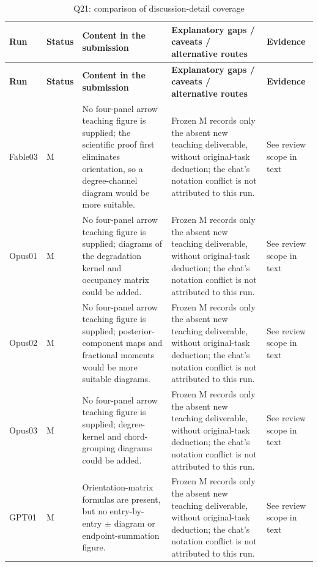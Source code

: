 \documentclass[11pt,a4paper]{article}
\begin{document}
{\fontsize{9.0}{12.6}\selectfont
\setlength{\tabcolsep}{2.5pt}
\begin{longtable}{>{\raggedright\arraybackslash}p{}>{\raggedright\arraybackslash}p{}>{\raggedright\arraybackslash}p{}>{\raggedright\arraybackslash}p{}>{\raggedright\arraybackslash}p{}}
\caption{Q21: comparison of discussion-detail coverage}\\
\toprule
\textbf{Run} & \textbf{Status} & \textbf{Content in the submission} & \textbf{Explanatory gaps /\allowbreak{} caveats /\allowbreak{} alternative routes} & \textbf{Evidence}\tabularnewline
\midrule
\endfirsthead
\toprule
\textbf{Run} & \textbf{Status} & \textbf{Content in the submission} & \textbf{Explanatory gaps /\allowbreak{} caveats /\allowbreak{} alternative routes} & \textbf{Evidence}\tabularnewline
\midrule
\endhead
{}Fable03 & M & No four-panel arrow teaching figure is supplied; the scientific proof first eliminates orientation,\allowbreak{} so a degree-channel diagram would be more suitable. & Frozen M records only the absent new teaching deliverable,\allowbreak{} without original-task deduction; the chat’s notation conflict is not attributed to this run. & See review scope in text\tabularnewline
{}Opus01 & M & No four-panel arrow teaching figure is supplied; diagrams of the degradation kernel and occupancy matrix could be added. & Frozen M records only the absent new teaching deliverable,\allowbreak{} without original-task deduction; the chat’s notation conflict is not attributed to this run. & See review scope in text\tabularnewline
{}Opus02 & M & No four-panel arrow teaching figure is supplied; posterior-component maps and fractional moments would be more suitable diagrams. & Frozen M records only the absent new teaching deliverable,\allowbreak{} without original-task deduction; the chat’s notation conflict is not attributed to this run. & See review scope in text\tabularnewline
{}Opus03 & M & No four-panel arrow teaching figure is supplied; degree-kernel and chord-grouping diagrams could be added. & Frozen M records only the absent new teaching deliverable,\allowbreak{} without original-task deduction; the chat’s notation conflict is not attributed to this run. & See review scope in text\tabularnewline
{}GPT01 & M & Orientation-matrix formulas are present,\allowbreak{} but no entry-by-entry \ensuremath{\pm} diagram or endpoint-summation figure. & Frozen M records only the absent new teaching deliverable,\allowbreak{} without original-task deduction; the chat’s notation conflict is not attributed to this run. & See review scope in text\tabularnewline

\end{longtable}}
\end{document}

